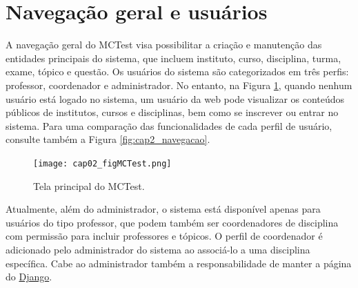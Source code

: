 \section{Navegação geral e usuários}

A navegação geral do MCTest visa possibilitar a criação e manutenção das entidades principais do sistema, que incluem instituto, curso, disciplina, turma, exame, tópico e questão. Os usuários do sistema são categorizados em três perfis: professor, coordenador e administrador. No entanto, na Figura \ref{fig:MCTest}, quando nenhum usuário está logado no sistema, um usuário da web pode visualizar os conteúdos públicos de institutos, cursos e disciplinas, bem como se inscrever ou entrar no sistema. Para uma comparação das funcionalidades de cada perfil de usuário, consulte também a Figura \ref{fig:cap2_navegacao}.
%
\begin{figure}[!ht]
  \centering
  \texttt{[image: cap02\_figMCTest.png]}
  \caption{Tela principal do MCTest.}
  \label{fig:MCTest}
\end{figure}



Atualmente, além do administrador, o sistema está disponível apenas para usuários do tipo professor, que podem também ser coordenadores de disciplina com permissão para incluir professores e tópicos. O perfil de coordenador é adicionado pelo administrador do sistema ao associá-lo a uma disciplina específica. Cabe ao administrador também a responsabilidade de manter a página do \href{https://www.djangoproject.com/}{Django}.

